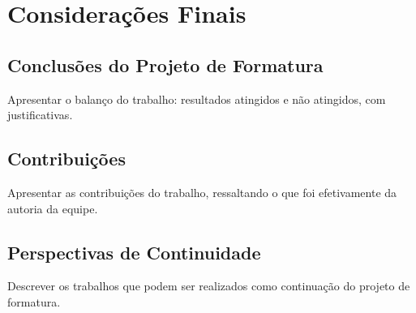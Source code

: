 \chapter{Considerações Finais} \label{cap:consideracoes}

\section{Conclusões do Projeto de Formatura}
Apresentar o balanço do trabalho: resultados atingidos e não atingidos, com justificativas.

\section{Contribuições}
Apresentar as contribuições do trabalho, ressaltando o que foi efetivamente da autoria da equipe.

\section{Perspectivas de Continuidade}
Descrever os trabalhos que podem ser realizados como continuação do projeto de formatura.